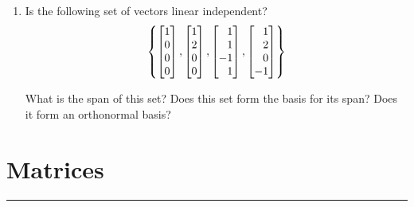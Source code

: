 \documentclass[
11pt, %
a4paper, %
oneside, %
headinclude,footinclude, %
BCOR5mm, %
]{scrartcl}
\def\bmx{\ensuremath\begin{bmatrix*}[r]}
\def\emx{\ensuremath\end{bmatrix*}}
\begin{document}
\begin{enumerate}
\item Is the following set of vectors linear independent?
\[ \left\{ \bmx 1 \\ 0 \\ 0 \\ 0 \emx, \bmx 1 \\ 2 \\ 0 \\ 0 \emx , \bmx 1 \\ 1 \\ -1 \\ 1 \emx , \bmx 1 \\ 2 \\ 0 \\ -1 \emx  \right\} \]

What is the span of this set? Does this set form the basis for its span? Does it form an orthonormal basis?

\end{enumerate}

\newpage

\section{Matrices}
\hrule
\vspace{0.5cm}
\end{document}
